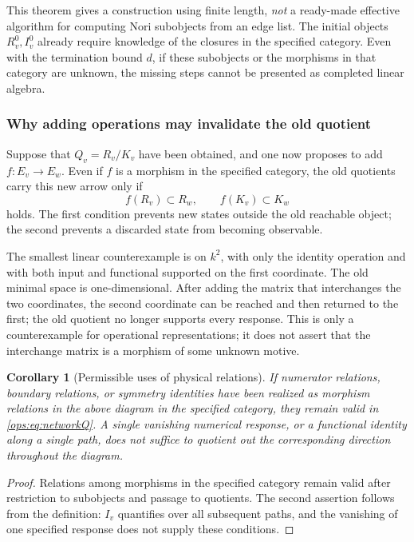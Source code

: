\documentclass[11pt,a4paper,oneside]{article}
\theoremstyle{plain}
\newtheorem{corollary}[theorem]{Corollary}
\theoremstyle{definition}
\theoremstyle{remark}
\numberwithin{equation}{section}
\begin{document}
This theorem gives a construction using finite length, \emph{not} a ready-made effective algorithm for computing Nori subobjects from an edge list.
The initial objects $R_v^0,I_v^0$ already require knowledge of the closures in the specified category.
Even with the termination bound $d$, if these subobjects or the morphisms in that category are unknown,
the missing steps cannot be presented as completed linear algebra.

\subsubsection{Why adding operations may invalidate the old quotient}
Suppose that $Q_v=R_v/K_v$ have been obtained, and one now proposes to add $f:E_v\to E_w$.
Even if $f$ is a morphism in the specified category, the old quotients carry this new arrow only if
\begin{equation}\label{ops:eq:descent}
 f(R_v)\subset R_w,\qquad f(K_v)\subset K_w
\end{equation}
holds. The first condition prevents new states outside the old reachable object;
the second prevents a discarded state from becoming observable.

The smallest linear counterexample is on $k^2$, with only the identity operation and with both input and functional supported on the first coordinate.
The old minimal space is one-dimensional. After adding the matrix that interchanges the two coordinates,
the second coordinate can be reached and then returned to the first; the old quotient no longer supports every response.
This is only a counterexample for operational representations; it does not assert that the interchange matrix is a morphism of some unknown motive.

\begin{corollary}[Permissible uses of physical relations]
If numerator relations, boundary relations, or symmetry identities have been realized as morphism relations in the above diagram in the specified category,
they remain valid in \eqref{ops:eq:networkQ}.
A single vanishing numerical response, or a functional identity along a single path,
does not suffice to quotient out the corresponding direction throughout the diagram.
\end{corollary}
\begin{proof}
Relations among morphisms in the specified category remain valid after restriction to subobjects and passage to quotients.
The second assertion follows from the definition: $I_v$ quantifies over all subsequent paths,
and the vanishing of one specified response does not supply these conditions.
\end{proof}
\end{document}
